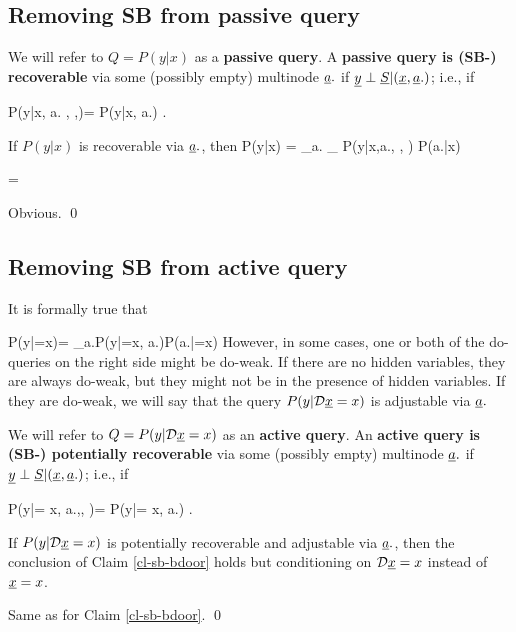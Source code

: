 \subsection{Removing SB from
passive query}

We will refer to $Q=P(y|x)$ 
as a {\bf  passive query}. A
{\bf passive query is
(SB-) recoverable}
via some (possibly empty) multinode $\rva.$ if $\rvy\perp\rvS|(\rvx, \rva.)$; i.e., if

\beq
P(y|x, a. , \beta,)=
P(y|x, a.)
\;.
\eeq

\begin{claim}\label{cl-sb-recov}
If 
$P(y|x)$ is recoverable via $\rva.$, then
\beq
P(y|x)
=
\sum_{a.}
_
{P(y|x,a., \beta, )}
P(a.|x)
\eeq

\beq
\bcen
{}\ecen
=
\bcen
{}\ecen
\eeq
\label{cl-sb-bdoor}
\end{claim}
\proof
Obvious.
\qed

\subsection{Removing SB from
active query}

It is formally true that

\beq
P(y|\cald \rvx=x)=
\sum_{a.}P(y|\cald\rvx=x, a.)P(a.|\cald\rvx=x)
\eeq
However, in some cases, one or both of the do-queries on 
the right side might be do-weak.
If there are no hidden variables,
they are always do-weak, but they might not be
 in the presence of hidden variables. If they
are do-weak, we will say that the query
$P(y|\cald\rvx=x)$ is adjustable via $\rva.$

We will refer to $Q=P(y|\cald \rvx=x)$ 
as an {\bf  active query}.
An {\bf active query is
(SB-) potentially recoverable}
via some (possibly empty) multinode $\rva.$ if $\rvy\perp\rvS|(\rvx, \rva.)$; i.e., if

\beq
P(y|\cald \rvx = x, a.,\beta, )=
P(y|\cald \rvx = x, a.)
\;.
\eeq
%


\begin{claim} If $P(y|\cald \rvx=x)$ is potentially 
recoverable and adjustable via $\rva.$, then 
the conclusion of Claim \ref{cl-sb-bdoor} holds
but conditioning on $\cald\rvx=x$ instead of $\rvx=x$.
\end{claim}
\proof
Same as for Claim \ref{cl-sb-bdoor}.
\qed
                                      
